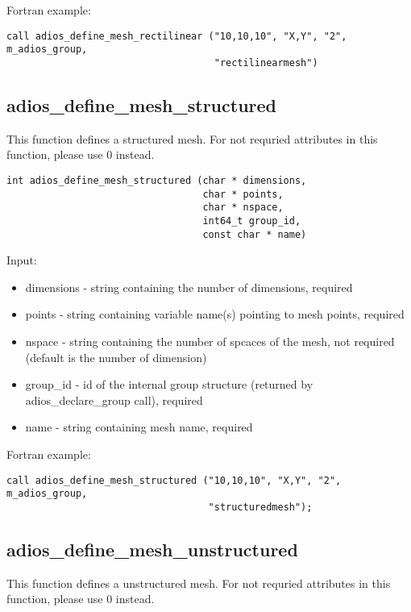 Fortran example:
\begin{lstlisting}[alsolanguage=Fortran,caption={},label={}]
call adios_define_mesh_rectilinear ("10,10,10", "X,Y", "2", m_adios_group, 
                                    "rectilinearmesh")
\end{lstlisting}


\subsection{adios\_define\_mesh\_structured}
This function defines a structured mesh. For not requried attributes in this function, please use 0 instead.

\begin{lstlisting}[alsolanguage=Fortran,caption={},label={}]
int adios_define_mesh_structured (char * dimensions,
                                  char * points,
                                  char * nspace,
                                  int64_t group_id,
                                  const char * name)
\end{lstlisting}

Input:
\begin{itemize}
\item dimensions - string containing the number of dimensions, required
\item points - string containing variable name(s) pointing to mesh points, required 
\item nspace - string containing the number of spcaces of the mesh, not required (default is the number of dimension)
\item group\_id - id of the internal group structure (returned by adios\_declare\_group call), required
\item name - string containing mesh name, required
\end{itemize}

Fortran example:
\begin{lstlisting}[alsolanguage=Fortran,caption={},label={}]
call adios_define_mesh_structured ("10,10,10", "X,Y", "2", m_adios_group, 
                                   "structuredmesh");
\end{lstlisting}


\subsection{adios\_define\_mesh\_unstructured}
This function defines a unstructured mesh. For not requried attributes in this function, please use 0 instead.

